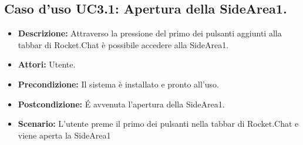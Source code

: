 \subsection{Caso d'uso UC3.1: Apertura della SideArea1.}
\begin{itemize}
\item[]\textbf{Descrizione:} Attraverso la pressione del primo dei pulsanti aggiunti alla tabbar di Rocket.Chat è possibile accedere alla SideArea1.
\item[]\textbf{Attori:} Utente. 
\item[]\textbf{Precondizione:} Il sistema è installato e pronto all'uso. 
\item[]\textbf{Postcondizione:} \'E avvenuta l'apertura della SideArea1. 
\item[]\textbf{Scenario:}
L'utente preme il primo dei pulsanti nella tabbar di Rocket.Chat e viene aperta la SideArea1 
\end{itemize}

\clearpage

